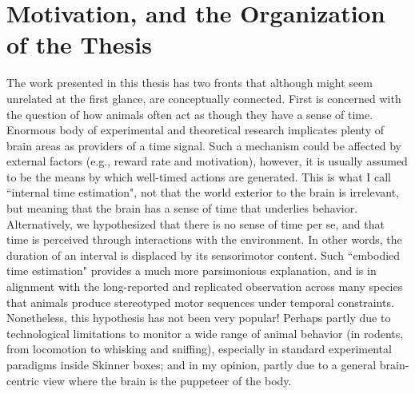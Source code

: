 \section[Motivation and Organization]{Motivation, and the Organization of the Thesis}
\label{intro:question}

The work presented in this thesis has two fronts that although might seem unrelated at the first glance, are conceptually connected.
First is concerned with the question of how animals often act as though they have a sense of time.
Enormous body of experimental and theoretical research implicates plenty of brain areas as providers of a time signal.
Such a mechanism could be affected by external factors (e.g., reward rate and motivation), however, it is usually assumed to be the means by which well-timed actions are generated.
This is what I call ``internal time estimation", not that the world exterior to the brain is irrelevant, but meaning that the brain has a sense of time that underlies behavior.
Alternatively, we hypothesized that there is no sense of time per se, and that time is perceived through interactions with the environment.
In other words, the duration of an interval is displaced by its sensorimotor content.
Such ``embodied time estimation" provides a much more parsimonious explanation, and is in alignment with the long-reported and replicated observation across many species that animals produce stereotyped motor sequences under temporal constraints.
Nonetheless, this hypothesis has not been very popular!
Perhaps partly due to technological limitations to monitor a wide range of animal behavior (in rodents, from locomotion to whisking and sniffing), especially in standard experimental paradigms inside Skinner boxes; and in my opinion, partly due to a general brain-centric view where the brain is the puppeteer of the body.
